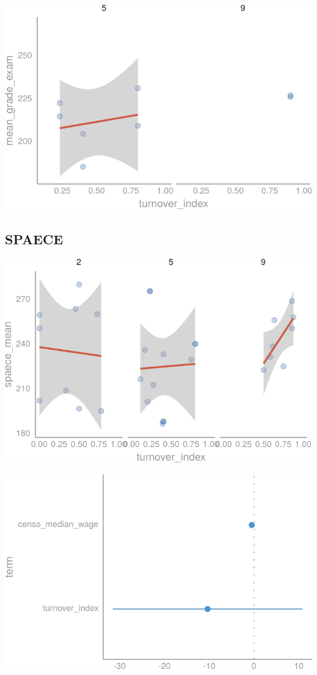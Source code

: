 \documentclass[12pt,]{article}
\begin{document}
\begin{center}\includegraphics{dissertation_files/figure-latex/unnamed-chunk-39-1} \end{center}

\hypertarget{spaece}{%
\subsection{SPAECE}\label{spaece}}

\begin{center}\includegraphics{dissertation_files/figure-latex/unnamed-chunk-40-1} \end{center}

\begin{center}\includegraphics{dissertation_files/figure-latex/unnamed-chunk-40-2} \end{center}
\end{document}
